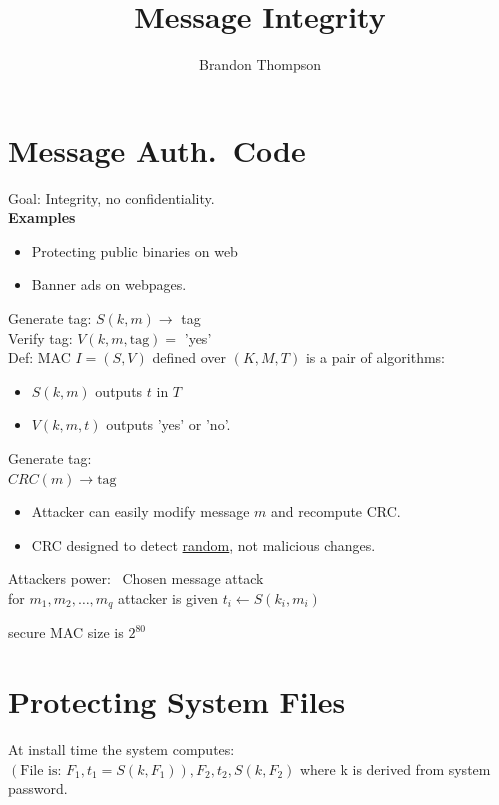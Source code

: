 \documentclass[a4paper]{article}
\begin{document}
\title{Message Integrity}
\author{Brandon Thompson}

	\section{Message Auth.\ Code}
	Goal: Integrity, no confidentiality.\\
	\textbf{Examples}
	\begin{itemize}
		\item Protecting public binaries on web
		\item Banner ads on webpages.
	\end{itemize}
	Generate tag: $S(k,m)\to $ tag\\
	Verify tag: $V\left( k,m,\text{tag} \right) =$ 'yes'\\
	Def: MAC $I=\left( S,V \right) $ defined over $\left( K,M,T \right) $ is a pair of algorithms:
	\begin{itemize}
		\item $S\left( k,m \right) $ outputs $t$ in $T$
		\item  $V\left( k,m,t \right) $ outputs 'yes' or 'no'.
	\end{itemize}
	
	Generate tag:\\
	$CRC\left( m \right) \to \text{tag}$ 
	\begin{itemize}
		\item Attacker can easily modify message $m$ and recompute CRC.
		\item CRC designed to detect \underline{random}, not malicious changes.
	\end{itemize}
	
	Attackers power: \ Chosen message attack\\
	for $m_1,m_2,\ldots,m_q$ attacker is given $t_i \leftarrow S\left( k_i,m_i \right) $ 

	secure MAC size is $2^{80}$ 
	
	\section{Protecting System Files}
	At install time the system computes: $\left( \text{File is: }F_1, t_1=S\left( k,F_1 \right)  \right) , F_2,t_2,S\left( k,F_2 \right) $
	where k is derived from system password.\\
\end{document}
